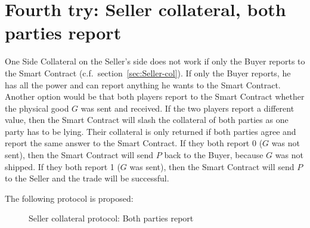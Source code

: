 \documentclass{cacthesis}
\newcommand{\authnote}[3]{{ \footnotesize \textbf{#1[#2: #3]~}}}
\newcommand{\orfnote}[1]{\authnote{\color{blue}}{Orfeas}{#1}}
\begin{document}
\section{Fourth try: Seller collateral, both parties report}
\label{sec:Sellercol-both-report}
One Side Collateral on the Seller's side does not work if only the Buyer reports
to the Smart Contract (c.f.\ section~\ref{sec:Seller-col}). If only the Buyer reports, he has all the power and can report anything he wants to the Smart Contract.
Another option would be that both players report to the Smart Contract whether the physical good $G$ was sent and received.
If the two players report a different value, then the Smart Contract will slash
the collateral of both parties as one party has to be lying. Their collateral is only returned if both parties
agree and report the same answer to the Smart Contract. If they both report 0 ($G$ was not sent),
then the Smart Contract will send $P$ back to the Buyer, because $G$ was not
shipped. If they both report 1 ($G$ was sent), then the Smart Contract will send
$P$ to the Seller and the trade will be successful.\newline

The following protocol is proposed:\newline
\begin{figure}[htb!]
\label{pro:Seller-col-both-report}
    \centering
    \caption{Seller collateral protocol: Both parties report} 
    \label{fig:blabla}
\end{figure}
\end{document}
